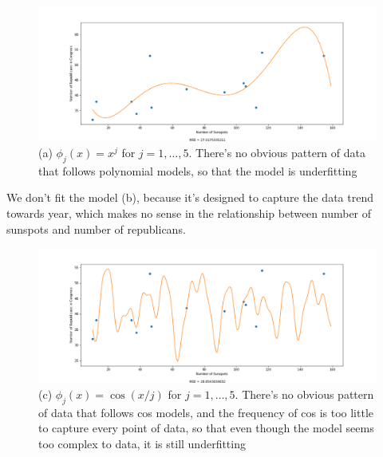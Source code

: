 \documentclass[submit]{harvardml}
\begin{document}
\begin{itemize}
\begin{figure}[h]
\centering
\includegraphics[width=\textwidth]{data/2_a_2}
\caption{(a) $\phi_j(x) = x^j$ for $j=1, \ldots, 5$. There's no obvious pattern of data that follows polynomial models, so that the model is underfitting}
\label{fig:2_a_2}
\end{figure}

\newpage
We don't fit the model (b), because it's designed to capture the data trend towards year, which makes no sense in the relationship between number of sunspots and number of republicans.
\begin{figure}[h]
\centering
\includegraphics[width=\textwidth]{data/2_c_2}
\caption{(c) $\phi_j(x) = \cos(x / j)$ for $j=1, \ldots, 5$. There's no obvious pattern of data that follows cos models, and the frequency of cos is too little to capture every point of data, so that even though the model seems too complex to data, it is still underfitting}
\label{fig:2_c_2}
\end{figure}


\end{itemize}
\end{document}
